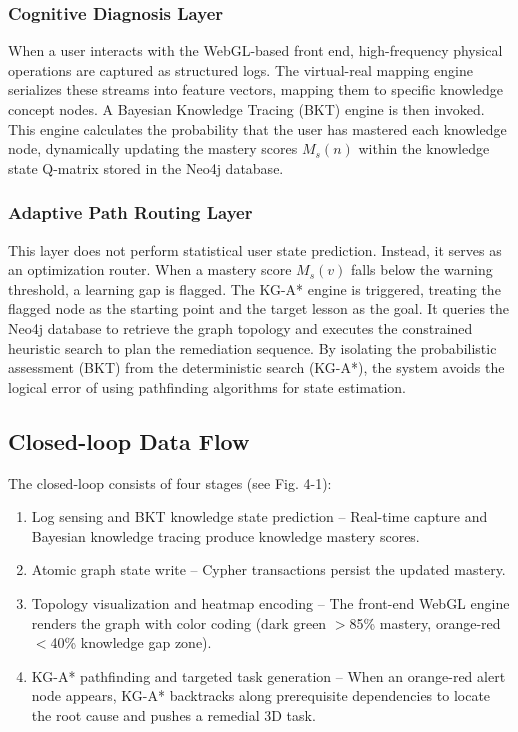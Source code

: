 \documentclass{ieeeaccess}
\begin{document}
\subsubsection{Cognitive Diagnosis Layer}
When a user interacts with the WebGL-based front end, high-frequency physical operations are captured as structured logs. The virtual-real mapping engine serializes these streams into feature vectors, mapping them to specific knowledge concept nodes. A Bayesian Knowledge Tracing (BKT) engine is then invoked. This engine calculates the probability that the user has mastered each knowledge node, dynamically updating the mastery scores $M_s(n)$ within the knowledge state Q-matrix stored in the Neo4j database.

\subsubsection{Adaptive Path Routing Layer}
This layer does not perform statistical user state prediction. Instead, it serves as an optimization router. When a mastery score $M_s(v)$ falls below the warning threshold, a learning gap is flagged. The KG-A* engine is triggered, treating the flagged node as the starting point and the target lesson as the goal. It queries the Neo4j database to retrieve the graph topology and executes the constrained heuristic search to plan the remediation sequence. By isolating the probabilistic assessment (BKT) from the deterministic search (KG-A*), the system avoids the logical error of using pathfinding algorithms for state estimation.

\subsection{Closed-loop Data Flow}
The closed-loop consists of four stages (see Fig. 4-1):
\begin{enumerate}
\item Log sensing and BKT knowledge state prediction – Real-time capture and Bayesian knowledge tracing produce knowledge mastery scores.
\item Atomic graph state write – Cypher transactions persist the updated mastery.
\item Topology visualization and heatmap encoding – The front-end WebGL engine renders the graph with color coding (dark green $>$85\% mastery, orange-red $<$40\% knowledge gap zone).
\item KG-A* pathfinding and targeted task generation – When an orange-red alert node appears, KG-A* backtracks along prerequisite dependencies to locate the root cause and pushes a remedial 3D task.
\end{enumerate}
\end{document}
